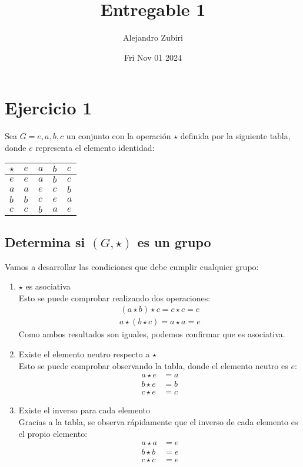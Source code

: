 \documentclass{article}
\author{Alejandro Zubiri}
\date{Fri Nov 01 2024}
\title{Entregable 1}
\begin{document}
\maketitle
\tableofcontents
\pagebreak
\section{Ejercicio 1}
Sea $G = {e, a, b, c}$ un conjunto con la operación $\star$ definida por la siguiente tabla, donde $e$ representa
el elemento identidad:
\begin{table}[h!]
    \centering
    \begin{tabular}{l|llll}
    $\star$ & $e$ & $a$ & $b$ & $c$ \\ \hline
    $e$ & $e$ & $a$ & $b$ &  $c$\\
    $a$ & $a$ & $e$ & $c$ & $b$ \\
    $b$ & $b$ & $c$ & $e$ & $a$ \\
    $c$ & $c$ & $b$ & $a$ & $e$
    \end{tabular}
    \end{table}
\subsection{Determina si $(G,\star)$ es un grupo}
Vamos a desarrollar las condiciones que debe cumplir cualquier grupo:
\begin{enumerate}
    \item $\star$ es asociativa\\
    Esto se puede comprobar realizando dos operaciones:
    \begin{align}
        (a\star b)\star c = c\star c = e
    \end{align}
    \begin{align}
    a \star (b\star c) = a\star a = e
    \end{align}
    Como ambos resultados son iguales, podemos confirmar que es asociativa.
    \item Existe el elemento neutro respecto a $\star$\\
    Esto se puede comprobar observando la tabla, donde el elemento neutro es $e$:
    \begin{align}
        a\star e &= a\\ b \star e &= b \\ c \star e &= c
    \end{align}
    \item Existe el inverso para cada elemento\\
    Gracias a la tabla, se observa rápidamente que el inverso de cada elemento es el propio elemento:
    \begin{align}
    a\star a &= e\\ b\star b &= e \\c\star c &= e
    \end{align}
\end{enumerate}
\end{document}
